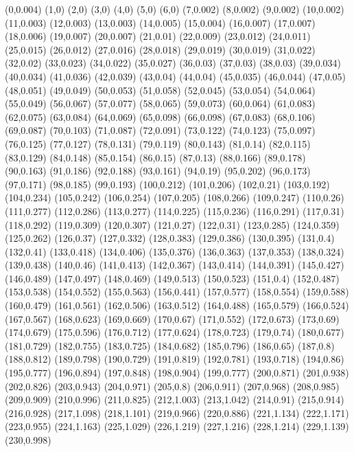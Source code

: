 (0,0.004)
(1,0)
(2,0)
(3,0)
(4,0)
(5,0)
(6,0)
(7,0.002)
(8,0.002)
(9,0.002)
(10,0.002)
(11,0.003)
(12,0.003)
(13,0.003)
(14,0.005)
(15,0.004)
(16,0.007)
(17,0.007)
(18,0.006)
(19,0.007)
(20,0.007)
(21,0.01)
(22,0.009)
(23,0.012)
(24,0.011)
(25,0.015)
(26,0.012)
(27,0.016)
(28,0.018)
(29,0.019)
(30,0.019)
(31,0.022)
(32,0.02)
(33,0.023)
(34,0.022)
(35,0.027)
(36,0.03)
(37,0.03)
(38,0.03)
(39,0.034)
(40,0.034)
(41,0.036)
(42,0.039)
(43,0.04)
(44,0.04)
(45,0.035)
(46,0.044)
(47,0.05)
(48,0.051)
(49,0.049)
(50,0.053)
(51,0.058)
(52,0.045)
(53,0.054)
(54,0.064)
(55,0.049)
(56,0.067)
(57,0.077)
(58,0.065)
(59,0.073)
(60,0.064)
(61,0.083)
(62,0.075)
(63,0.084)
(64,0.069)
(65,0.098)
(66,0.098)
(67,0.083)
(68,0.106)
(69,0.087)
(70,0.103)
(71,0.087)
(72,0.091)
(73,0.122)
(74,0.123)
(75,0.097)
(76,0.125)
(77,0.127)
(78,0.131)
(79,0.119)
(80,0.143)
(81,0.14)
(82,0.115)
(83,0.129)
(84,0.148)
(85,0.154)
(86,0.15)
(87,0.13)
(88,0.166)
(89,0.178)
(90,0.163)
(91,0.186)
(92,0.188)
(93,0.161)
(94,0.19)
(95,0.202)
(96,0.173)
(97,0.171)
(98,0.185)
(99,0.193)
(100,0.212)
(101,0.206)
(102,0.21)
(103,0.192)
(104,0.234)
(105,0.242)
(106,0.254)
(107,0.205)
(108,0.266)
(109,0.247)
(110,0.26)
(111,0.277)
(112,0.286)
(113,0.277)
(114,0.225)
(115,0.236)
(116,0.291)
(117,0.31)
(118,0.292)
(119,0.309)
(120,0.307)
(121,0.27)
(122,0.31)
(123,0.285)
(124,0.359)
(125,0.262)
(126,0.37)
(127,0.332)
(128,0.383)
(129,0.386)
(130,0.395)
(131,0.4)
(132,0.41)
(133,0.418)
(134,0.406)
(135,0.376)
(136,0.363)
(137,0.353)
(138,0.324)
(139,0.438)
(140,0.46)
(141,0.413)
(142,0.367)
(143,0.414)
(144,0.391)
(145,0.427)
(146,0.489)
(147,0.497)
(148,0.469)
(149,0.513)
(150,0.523)
(151,0.4)
(152,0.487)
(153,0.538)
(154,0.552)
(155,0.563)
(156,0.441)
(157,0.577)
(158,0.554)
(159,0.588)
(160,0.479)
(161,0.561)
(162,0.506)
(163,0.512)
(164,0.488)
(165,0.579)
(166,0.524)
(167,0.567)
(168,0.623)
(169,0.669)
(170,0.67)
(171,0.552)
(172,0.673)
(173,0.69)
(174,0.679)
(175,0.596)
(176,0.712)
(177,0.624)
(178,0.723)
(179,0.74)
(180,0.677)
(181,0.729)
(182,0.755)
(183,0.725)
(184,0.682)
(185,0.796)
(186,0.65)
(187,0.8)
(188,0.812)
(189,0.798)
(190,0.729)
(191,0.819)
(192,0.781)
(193,0.718)
(194,0.86)
(195,0.777)
(196,0.894)
(197,0.848)
(198,0.904)
(199,0.777)
(200,0.871)
(201,0.938)
(202,0.826)
(203,0.943)
(204,0.971)
(205,0.8)
(206,0.911)
(207,0.968)
(208,0.985)
(209,0.909)
(210,0.996)
(211,0.825)
(212,1.003)
(213,1.042)
(214,0.91)
(215,0.914)
(216,0.928)
(217,1.098)
(218,1.101)
(219,0.966)
(220,0.886)
(221,1.134)
(222,1.171)
(223,0.955)
(224,1.163)
(225,1.029)
(226,1.219)
(227,1.216)
(228,1.214)
(229,1.139)
(230,0.998)

